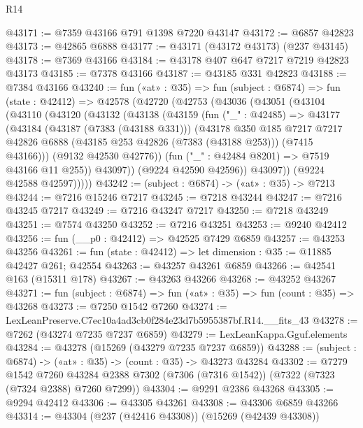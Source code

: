 \begin{lexlean}{R14}
\begin{coremodule}
@43171 := @7359 @43166 @791 @1398 @7220 @43147
@43172 := @6857 @42823
@43173 := @42865 @6888
@43177 := @43171 (@43172 @43173) (@237 @43145)
@43178 := @7369 @43166
@43184 := @43178 @407 @647 @7217 @7219 @42823 @43173
@43185 := @7378 @43166
@43187 := @43185 @331 @42823
@43188 := @7384 @43166
@43240 := fun («at» : @35) =>
  fun (subject : @6874) =>
  fun (state : @42412) =>
  @42578
    (@42720
      (@42753
        (@43036
          (@43051
            (@43104
              (@43110
                (@43120
                  (@43132
                    (@43138
                      (@43159
                        (fun ("_" : @42485) =>
                        @43177
                          (@43184
                            (@43187 (@7383 (@43188 @331)))
                            (@43178
                              @350
                              @185
                              @7217
                              @7217
                              @42826
                              @6888
                              (@43185 @253 @42826 (@7383 (@43188 @253)))
                              (@7415 @43166)))
                          (@9132 @42530 @42776))
                        (fun ("_" : @42484 @8201) => @7519 @43166 @11 @255))
                      @43097))
                  (@9224 @42590 @42596))
                @43097))
            (@9224 @42588 @42597)))))
@43242 := (subject : @6874) -> («at» : @35) -> @7213
@43244 := @7216 @15246 @7217
@43245 := @7218 @43244
@43247 := @7216 @43245 @7217
@43249 := @7216 @43247 @7217
@43250 := @7218 @43249
@43251 := @7574 @43250
@43252 := @7216 @43251
@43253 := @9240 @42412
@43256 := fun (__p0 : @42412) => @42525 @7429 @6859
@43257 := @43253 @43256
@43261 := fun (state : @42412) => let dimension : @35 := @11885 @42427 @261; @42554
@43263 := @43257 @43261 @6859
@43266 := @42541 @163 (@15311 @178)
@43267 := @43263 @43266
@43268 := @43252 @43267
@43271 := fun (subject : @6874) => fun («at» : @35) => fun (count : @35) => @43268
@43273 := @7250 @1542 @7260
@43274 := LexLeanPreserve.C7ec10a4ad3cb0f284e23d7b5955387bf.R14.__fits_43
@43278 := @7262 (@43274 @7235 @7237 @6859)
@43279 := LexLeanKappa.Gguf.elements
@43284 := @43278 (@15269 (@43279 @7235 @7237 @6859))
@43288 := (subject : @6874) -> («at» : @35) -> (count : @35) -> @43273 @43284
@43302 := @7279
    @1542
    @7260
    @43284
    @2388
    @7302
    (@7306 (@7316 @1542))
    (@7322 (@7323 (@7324 @2388) @7260 @7299))
@43304 := @9291 @2386 @43268
@43305 := @9294 @42412
@43306 := @43305 @43261
@43308 := @43306 @6859 @43266
@43314 := @43304 (@237 (@42416 @43308)) (@15269 (@42439 @43308))

\end{coremodule}
\end{lexlean}
